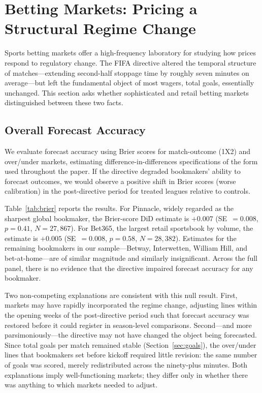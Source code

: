 
\section{Betting Markets: Pricing a Structural Regime Change}\label{sec:betting}

Sports betting markets offer a high-frequency laboratory for studying how
prices respond to regulatory change. The FIFA directive altered the temporal
structure of matches---extending second-half stoppage time by roughly seven
minutes on average---but left the fundamental object of most wagers, total
goals, essentially unchanged. This section asks whether sophisticated and
retail betting markets distinguished between these two facts.

\subsection{Overall Forecast Accuracy}\label{subsec:brier}

We evaluate forecast accuracy using Brier scores for match-outcome (1X2)
and over/under markets, estimating difference-in-differences specifications
of the form used throughout the paper. If the directive degraded
bookmakers' ability to forecast outcomes, we would observe a positive shift
in Brier scores (worse calibration) in the post-directive period for
treated leagues relative to controls.

Table~\ref{tab:brier} reports the results. For Pinnacle, widely regarded
as the sharpest global bookmaker, the Brier-score DiD estimate is $+0.007$
(SE~$= 0.008$, $p = 0.41$, $N = 27{,}867$). For Bet365, the
largest retail sportsbook by volume, the estimate is $+0.005$
(SE~$= 0.008$, $p = 0.58$, $N = 28{,}382$). Estimates for the
remaining bookmakers in our sample---Betway, Interwetten, William Hill,
and bet-at-home---are of similar magnitude and similarly insignificant.
Across the full panel, there is no evidence that the directive impaired
forecast accuracy for any bookmaker.

Two non-competing explanations are consistent with this null result.
First, markets may have rapidly incorporated the regime change, adjusting
lines within the opening weeks of the post-directive period such that
forecast accuracy was restored before it could register in
season-level comparisons. Second---and more parsimoniously---the directive
may not have changed the object being forecasted. Since total goals per
match remained stable (Section~\ref{sec:goals}), the over/under lines that
bookmakers set before kickoff required little revision: the same number of
goals was scored, merely redistributed across the ninety-plus minutes.
Both explanations imply well-functioning markets; they differ only in
whether there was anything to which markets needed to adjust.

